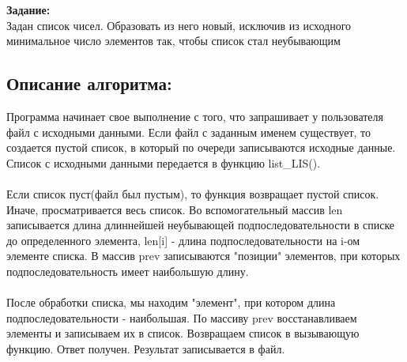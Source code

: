 \documentclass[a4paper,14pt]{extreport}
\begin{document}

\textbf{Задание:}\\
Задан список чисел. Образовать из него новый, исключив из исходного
 минимальное число элементов так, чтобы список стал неубывающим
\subsection*{Описание алгоритма:}
Программа начинает свое выполнение с того, что запрашивает у пользователя файл с исходными данными.
Если файл с заданным именем существует, то создается пустой список, в который по очереди записываются исходные данные.
Список с исходными данными передается в функцию list\_LIS().\\ \\
Если список пуст(файл был пустым), то функция возвращает пустой список. Иначе, просматривается весь список. 
Во вспомогательный массив len записывается длина длиннейшей неубывающей подпоследовательности в списке до определенного элемента, 
len[i] - длина подпоследовательности на i-ом элементе списка. В массив prev записываются "позиции" элементов, при которых
подпоследовательность имеет наибольшую длину. \\ \\
После обработки списка, мы находим "элемент", при котором длина подпоследовательности - наибольшая. 
По массиву prev восстанавливаем элементы и записываем их в список. Возвращаем список в вызывающую функцию. Ответ получен. 
Результат записывается в файл. 
\end{document}
